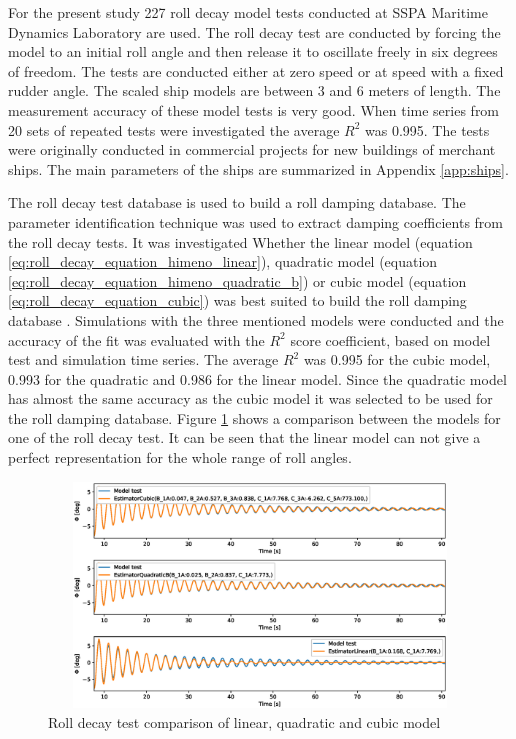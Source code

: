 For the present study 227  roll decay model tests conducted at SSPA Maritime Dynamics Laboratory are used. The roll decay test are conducted by forcing the model to an initial roll angle and then release it to oscillate freely in six degrees of freedom. The tests are conducted either  at zero speed or at speed with a fixed rudder angle. The scaled ship models are between 3 and 6 meters of length. The measurement accuracy of these model tests is very good. When time series from 20 sets of repeated tests were investigated the average $R^2$ was 0.995. The tests were originally conducted in commercial projects for new buildings of merchant ships. The main parameters of the ships are summarized in Appendix \ref{app:ships}. 

The roll decay test database is used to build a roll damping database. The parameter identification technique was used to extract damping coefficients from the roll decay tests. It was investigated Whether the linear model (equation \ref{eq:roll_decay_equation_himeno_linear}), quadratic model (equation \ref{eq:roll_decay_equation_himeno_quadratic_b}) or cubic model (equation \ref{eq:roll_decay_equation_cubic}) was best suited  to build the roll damping database . Simulations with the three mentioned models were conducted and the accuracy of the fit was evaluated with the $R^2$ score coefficient, based on model test and simulation time series.
The average $R^2$ was 0.995 for the cubic model, 0.993 for the quadratic and 0.986 for the linear model. Since the quadratic model has almost the same accuracy as the cubic model it was selected to be used for the roll damping database. Figure \ref{fig:roll_decay_model_compare} shows a comparison between the models for one of the roll decay test. It can be seen that the linear model can not give a perfect representation for the whole range of roll angles.

\begin{figure}[H]
    \centering
    \includegraphics[width=12cm, height = 6cm ]{figures/roll_decay_model_compare.eps}
    \caption{Roll decay test comparison of linear, quadratic and cubic model}
    \label{fig:roll_decay_model_compare}
\end{figure}

